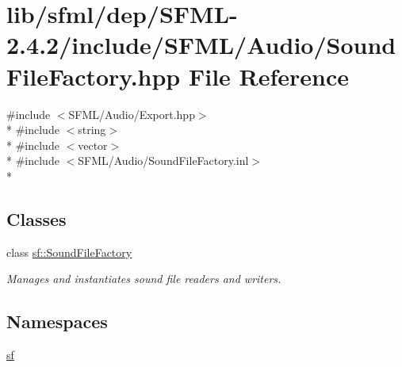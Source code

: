 \hypertarget{sfml_2dep_2_s_f_m_l-2_84_82_2include_2_s_f_m_l_2_audio_2_sound_file_factory_8hpp}{\section{lib/sfml/dep/\-S\-F\-M\-L-\/2.4.2/include/\-S\-F\-M\-L/\-Audio/\-Sound\-File\-Factory.hpp File Reference}
\label{sfml_2dep_2_s_f_m_l-2_84_82_2include_2_s_f_m_l_2_audio_2_sound_file_factory_8hpp}
}
{\ttfamily \#include $<$S\-F\-M\-L/\-Audio/\-Export.\-hpp$>$}\\*
{\ttfamily \#include $<$string$>$}\\*
{\ttfamily \#include $<$vector$>$}\\*
{\ttfamily \#include $<$S\-F\-M\-L/\-Audio/\-Sound\-File\-Factory.\-inl$>$}\\*
\subsection*{Classes}
\begin{DoxyCompactItemize}
\item 
class \hyperlink{classsf_1_1_sound_file_factory}{sf\-::\-Sound\-File\-Factory}
\begin{DoxyCompactList}\small\item\em Manages and instantiates sound file readers and writers. \end{DoxyCompactList}\end{DoxyCompactItemize}
\subsection*{Namespaces}
\begin{DoxyCompactItemize}
\item 
\hyperlink{namespacesf}{sf}
\end{DoxyCompactItemize}
